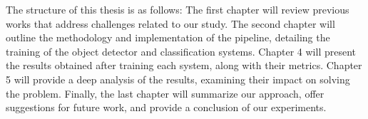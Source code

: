 The structure of this thesis is as follows: The first chapter will review previous works that address challenges related to our study. The second chapter will outline the methodology and implementation of the pipeline, detailing the training of the object detector and classification systems. Chapter 4 will present the results obtained after training each system, along with their metrics. Chapter 5 will provide a deep analysis of the results, examining their impact on solving the problem. Finally, the last chapter will summarize our approach, offer suggestions for future work, and provide a conclusion of our experiments. \\



